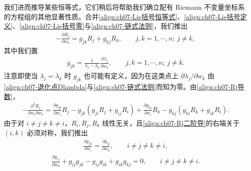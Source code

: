 \documentclass[../../main.tex]{subfiles}
\begin{document}
我们进而推导某些恒等式，它们稍后将帮助我们确立配有 Riemann 不变量坐标系的方程组的其他显著性质。合并\eqref{align:ch07-Lie括号恒等式}、\eqref{align:ch07-Lie括号定义}、\eqref{align:ch07-Lie括号零}与\eqref{align:ch07-链式法则}，我们推出
\begin{align}
-\frac{\partial R_j}{\partial w_k}=g_{jk}R_j+g_{kj}R_k,\qquad j,k=1,\cdots,n;\ j\neq k,
\label{align:ch07-Rj导数}
\end{align}
其中我们置
\begin{align}
g_{jk}=\frac{1}{\lambda_j-\lambda_k}\frac{\partial\lambda_j}{\partial w_k},\qquad j,k=1,\cdots,n;\ j\neq k.
\label{align:ch07-gjk定义}
\end{align}
注意即使当 $\lambda_j=\lambda_k$ 时 $g_{jk}$ 也可能有定义，因为在这类点上 $\partial\lambda_j/\partial w_k$ 由\eqref{align:ch07-退化点Dlambda}与\eqref{align:ch07-链式法则}而知为零。由\eqref{align:ch07-Rj导数}，
\begin{align}
-\frac{\partial^2 R_j}{\partial w_i\partial w_k}
=\frac{\partial g_{jk}}{\partial w_i}R_j-g_{jk}(g_{ji}R_j+g_{ij}R_i)
+\frac{\partial g_{kj}}{\partial w_i}R_k-g_{kj}(g_{ki}R_k+g_{ik}R_i).
\label{align:ch07-Rj二阶导}
\end{align}
由于对 $i\neq j\neq k\neq i$，$R_i,R_j,R_k$ 线性无关，且\eqref{align:ch07-Rj二阶导}的右端关于 $(i,k)$ 必须对称，我们推出
\begin{align}
\frac{\partial g_{jk}}{\partial w_i}=\frac{\partial g_{ji}}{\partial w_k},\qquad i\neq j\neq k\neq i,
\label{align:ch07-g对称}
\end{align}
\begin{align}
\frac{\partial g_{ij}}{\partial w_k}+g_{ij}g_{jk}-g_{ij}g_{ik}+g_{ik}g_{kj}=0,\qquad i\neq j\neq k\neq i.
\label{align:ch07-gCocycle}
\end{align}
\end{document}
